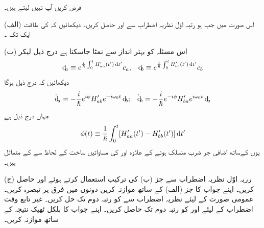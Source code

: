 فرض کریں آپ  نہیں لیتے ہیں۔

(الف) اس صورت میں جب  ہو رتبہ اوّل نظریہ اضطراب سے  اور  حاصل کریں۔ دیکھائیں کہ  کی طاقت ایک تک ۔

(ب) اس مسئلہ کو بہتر انداز سے نمٹا جاسکتا ہے درج ذیل لیکر
\begin{align}
	\dif_a\equiv e^{\frac{i}{\hslash}\int_{0}^{t}H'_{aa}(t')\dif t'}c_a,&&\dif_b\equiv e^{\frac{i}{\hslash}\int_{0}^{t}H'_{bb}(t')\dif t'}c_b
\end{align}
دیکھائیں کہ درج ذیل ہوگا 
\begin{align}
	\dot{\dif}_a=-\frac{i}{\hslash}e^{i\phi}H'_{ab}e^{-i\omega_0t}\dif_b;&&\dot{\dif}_b=-\frac{i}{\hslash}e^{-i\phi}H'_{ba}e^{i\omega_0t}\dif_a
\end{align}
جہاں درج ذیل ہے
\begin{align}
	\phi(t)\equiv\frac{1}{\hslash}\int_{0}^{t}[H'_{aa}(t')-H'_{bb}(t')]\dif t'
\end{align}
یوں  کےساتھ اضافی جز ضرب  منسلک ہونے کے علاوہ  اور  کی مساواتیں ساخت کے لحاظ سے  کے متماثل ہیں۔

(ج) رربہ اوّل نظریہ اضطراب سے جز (ب) کی ترکیب استعمال کرتے ہوئے  اور  حاصل کریں۔ اپنے جواب کا جز (الف) کے ساتھ موازنہ کریں دونوں میں فرق پر تبصرہ کریں۔
عمومی صورت  کے لیئے نظریہ اضطراب سے  کو رتبہ دوم تک حل کریں۔
غیر تابع وقت اضطراب  کے لیئے  اور  کو رتبہ دوم تک حاصل کریں۔ اپنے جواب کا بلکل ٹھیک نتیجہ کے ساتھ موازنہ کریں۔


